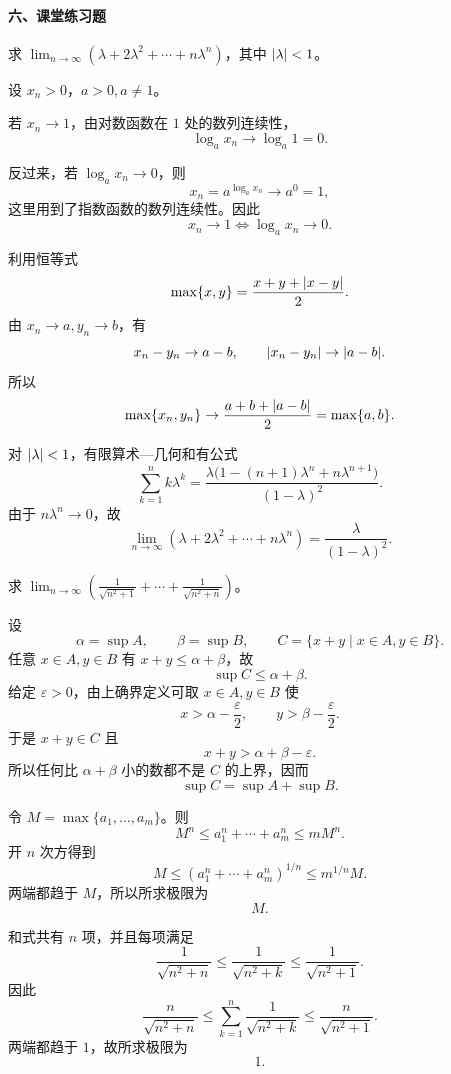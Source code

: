 \paragraph{六、课堂练习题}

\begin{xexercise}[1]
求 $\displaystyle\lim_{n\to\infty}(\lambda+2\lambda^2+\cdots+n\lambda^n)$，其中 $\lvert\lambda\rvert<1$。
\end{xexercise}
\begin{xsolution}
设 $x_n>0$，$a>0,a\ne1$。

若 $x_n\to1$，由对数函数在 $1$ 处的数列连续性，
\[
  \log_ax_n\to\log_a1=0.
\]

反过来，若 $\log_ax_n\to0$，则
\[
  x_n=a^{\log_ax_n}\to a^0=1,
\]
这里用到了指数函数的数列连续性。因此
\[
  \boxed{x_n\to1\Longleftrightarrow\log_ax_n\to0}.
\]

利用恒等式
\[
  \max\{x,y\}=\frac{x+y+\lvert x-y\rvert}2.
\]
由 $x_n\to a,y_n\to b$，有
\[
  x_n-y_n\to a-b,
  \qquad
  \lvert x_n-y_n\rvert\to\lvert a-b\rvert.
\]
所以
\[
  \max\{x_n,y_n\}
  \to\frac{a+b+\lvert a-b\rvert}2
  =\max\{a,b\}.
\]

对 $\lvert\lambda\rvert<1$，有限算术—几何和有公式
\[
  \sum_{k=1}^n k\lambda^k
  =\frac{\lambda\bigl(1-(n+1)\lambda^n+n\lambda^{n+1}\bigr)}{(1-\lambda)^2}.
\]
由于 $n\lambda^n\to0$，故
\[
  \boxed{\lim_{n\to\infty}(\lambda+2\lambda^2+\cdots+n\lambda^n)
  =\frac\lambda{(1-\lambda)^2}}.
\]
\end{xsolution}


\begin{xexercise}[2]
求 $\displaystyle\lim_{n\to\infty}\left(\frac1{\sqrt{n^2+1}}+\cdots+\frac1{\sqrt{n^2+n}}\right)$。
\end{xexercise}
\begin{xsolution}
设
\[
  \alpha=\sup A,\qquad\beta=\sup B,
  \qquad C=\{x+y\mid x\in A,y\in B\}.
\]
任意 $x\in A,y\in B$ 有 $x+y\le\alpha+\beta$，故
\[
  \sup C\le\alpha+\beta.
\]
给定 $\varepsilon>0$，由上确界定义可取 $x\in A,y\in B$ 使
\[
  x>\alpha-\frac\varepsilon2,
  \qquad y>\beta-\frac\varepsilon2.
\]
于是 $x+y\in C$ 且
\[
  x+y>\alpha+\beta-\varepsilon.
\]
所以任何比 $\alpha+\beta$ 小的数都不是 $C$ 的上界，因而
\[
  \boxed{\sup C=\sup A+\sup B}.
\]

令 $M=\max\{a_1,\ldots,a_m\}$。则
\[
  M^n\le a_1^n+\cdots+a_m^n\le mM^n.
\]
开 $n$ 次方得到
\[
  M\le(a_1^n+\cdots+a_m^n)^{1/n}\le m^{1/n}M.
\]
两端都趋于 $M$，所以所求极限为
\[
  \boxed{M}.
\]

和式共有 $n$ 项，并且每项满足
\[
  \frac1{\sqrt{n^2+n}}
  \le\frac1{\sqrt{n^2+k}}
  \le\frac1{\sqrt{n^2+1}}.
\]
因此
\[
  \frac n{\sqrt{n^2+n}}
  \le\sum_{k=1}^n\frac1{\sqrt{n^2+k}}
  \le\frac n{\sqrt{n^2+1}}.
\]
两端都趋于 $1$，故所求极限为
\[
  \boxed{1}.
\]
\end{xsolution}


